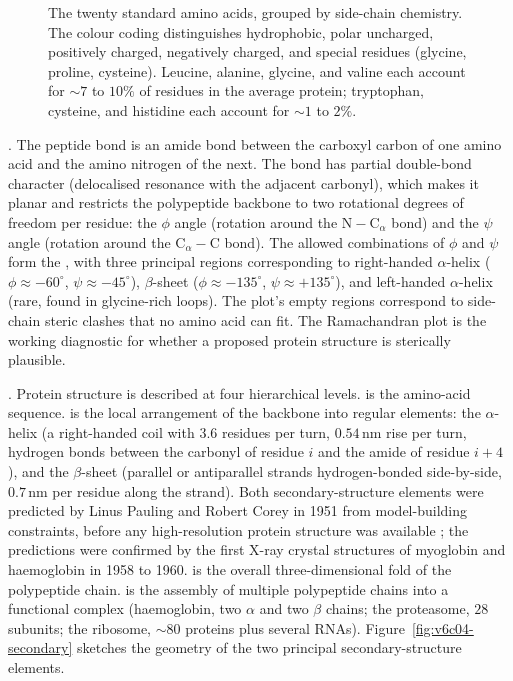 \begin{figure}[ht]
\centering

\caption{The twenty standard amino acids, grouped by side-chain
chemistry. The colour coding distinguishes hydrophobic, polar uncharged,
positively charged, negatively charged, and special residues (glycine,
proline, cysteine). Leucine, alanine, glycine, and valine each
account for $\sim 7$ to $10\%$ of residues in the average protein;
tryptophan, cysteine, and histidine each account for $\sim 1$ to
$2\%$.}
\label{fig:v6c04-aa-classes}
\end{figure}

. The peptide bond is an amide bond between
the carboxyl carbon of one amino acid and the amino nitrogen of the
next. The bond has partial double-bond character (delocalised
resonance with the adjacent carbonyl), which makes it planar and
restricts the polypeptide backbone to two rotational degrees of
freedom per residue: the $\phi$ angle (rotation around the
$\text{N}-\text{C}_\alpha$ bond) and the $\psi$ angle (rotation around
the $\text{C}_\alpha-\text{C}$ bond). The allowed combinations of
$\phi$ and $\psi$ form the 
\cite{paper:v6c04-ramachandran-1963}, with three principal regions
corresponding to right-handed $\alpha$-helix
($\phi \approx -60^{\circ}$, $\psi \approx -45^{\circ}$),
$\beta$-sheet ($\phi \approx -135^{\circ}$, $\psi \approx +135^{\circ}$),
and left-handed $\alpha$-helix (rare, found in glycine-rich loops).
The plot's empty regions correspond to side-chain steric clashes
that no amino acid can fit. The Ramachandran plot is the working
diagnostic for whether a proposed protein structure is sterically
plausible.

. Protein
structure is described at four hierarchical levels.  is the amino-acid sequence. 
is the local arrangement of the backbone into regular elements: the
$\alpha$-helix (a right-handed coil with $3.6$ residues per turn,
$0.54\,\text{nm}$ rise per turn, hydrogen bonds between the carbonyl
of residue $i$ and the amide of residue $i+4$), and the
$\beta$-sheet (parallel or antiparallel strands hydrogen-bonded
side-by-side, $0.7\,\text{nm}$ per residue along the strand). Both
secondary-structure elements were predicted by Linus Pauling and
Robert Corey in 1951 from model-building constraints, before any
high-resolution protein structure was available
\cite{paper:v6c04-pauling-corey-1951}; the predictions were confirmed
by the first X-ray crystal structures of myoglobin and haemoglobin in
1958 to 1960.  is the overall
three-dimensional fold of the polypeptide chain.  is the assembly of multiple polypeptide chains into a
functional complex (haemoglobin, two $\alpha$ and two $\beta$ chains;
the proteasome, $28$ subunits; the ribosome, $\sim 80$ proteins plus
several RNAs). Figure~\ref{fig:v6c04-secondary} sketches the geometry
of the two principal secondary-structure elements.

